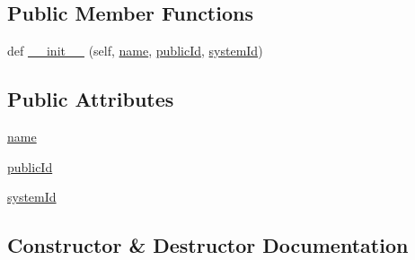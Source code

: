 \subsection*{Public Member Functions}
\begin{DoxyCompactItemize}
\item 
def \hyperlink{classpip_1_1__vendor_1_1html5lib_1_1treebuilders_1_1etree__lxml_1_1DocumentType_a8e1cb7dedde8cb11e293b1123343945e}{\+\_\+\+\_\+init\+\_\+\+\_\+} (self, \hyperlink{classpip_1_1__vendor_1_1html5lib_1_1treebuilders_1_1etree__lxml_1_1DocumentType_adaef1d443ca5295e1d6e2672a45599ef}{name}, \hyperlink{classpip_1_1__vendor_1_1html5lib_1_1treebuilders_1_1etree__lxml_1_1DocumentType_a0d68f15894e543cd2de45892316ceb51}{public\+Id}, \hyperlink{classpip_1_1__vendor_1_1html5lib_1_1treebuilders_1_1etree__lxml_1_1DocumentType_a23be3660c4dbba33a5a742f060b8fc27}{system\+Id})
\end{DoxyCompactItemize}
\subsection*{Public Attributes}
\begin{DoxyCompactItemize}
\item 
\hyperlink{classpip_1_1__vendor_1_1html5lib_1_1treebuilders_1_1etree__lxml_1_1DocumentType_adaef1d443ca5295e1d6e2672a45599ef}{name}
\item 
\hyperlink{classpip_1_1__vendor_1_1html5lib_1_1treebuilders_1_1etree__lxml_1_1DocumentType_a0d68f15894e543cd2de45892316ceb51}{public\+Id}
\item 
\hyperlink{classpip_1_1__vendor_1_1html5lib_1_1treebuilders_1_1etree__lxml_1_1DocumentType_a23be3660c4dbba33a5a742f060b8fc27}{system\+Id}
\end{DoxyCompactItemize}


\subsection{Constructor \& Destructor Documentation}
\mbox{\label{classpip_1_1__vendor_1_1html5lib_1_1treebuilders_1_1etree__lxml_1_1DocumentType_a8e1cb7dedde8cb11e293b1123343945e}} 
